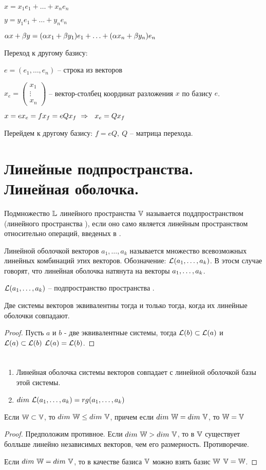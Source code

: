 $x=x_1e_1+\ldots+x_ne_n$

$y=y_1e_1+\ldots+y_ne_n$

$\alpha x+\beta y=(\alpha x_1+\beta y_1)e_1+\ldots+(\alpha x_n+\beta y_n)e_n$

Переход к другому базису:

$e=(e_1,\ldots,e_n)$ -- строка из векторов

$x_e=\left(\begin{matrix} x_1 \\ \vdots \\ x_n \end{matrix}\right)$ -- вектор-столбец координат разложения $x$ по базису $e$.

$x=ex_e=fx_f=eQx_f\ \then\ x_e=Qx_f$

Перейдем к другому базису: $f=eQ,\ Q$ -- матрица перехода.
\section{Линейные подпространства. Линейная оболочка.}
\begin{opred}
Подмножество $\mathbb{L}$ линейного пространства $\mathbb{V}$ называется поддпространством (линейного пространства \V), если оно само является линейным пространством относительно операций, введеных в \V.
\end{opred}
\begin{opred}
Линейной оболочкой векторов $a_1,\ldots,a_k$ называется множество всевозможных линейных комбинаций этих векторов. Обозначение: $\mathcal{L}(a_1,\ldots,a_k)$. В этосм случае говорят, что линейная оболочка натянута на векторы $a_1,\ldots,a_k$.
\end{opred}
\begin{stat}
$\mathcal{L}(a_1,\ldots,a_k)$ -- подпространство пространства \V.
\end{stat}
\begin{theor}
Две системы векторов эквивалентны тогда и только тогда, когда их линейные оболочки совпадают.
\end{theor}
\begin{proof}
Пусть $a$ и $b$  - две эквивалентные системы, тогда $\mathcal{L}(b)\subset\mathcal{L}(a)$ и $\mathcal{L}(a)\subset\mathcal{L}(b)$ \then $\mathcal{L}(a)=\mathcal{L}(b)$.
\end{proof}
\begin{effect}
$\phantom{dick}$
\begin{enumerate}
\item Линейная оболочка системы векторов совпадает с линейной оболочкой базы этой системы.
\item $dim\ \mathcal{L}(a_1,\ldots,a_k)=rg(a_1,\ldots,a_k)$
\end{enumerate}
\end{effect}
\begin{theor}
Если $\mathbb{W}\subset\mathbb{V}$, то $dim\ \mathbb{W}\leq dim\ \mathbb{V}$, причем если $dim\ \mathbb{W}=dim\ \mathbb{V}$, то $\mathbb{W}=\mathbb{V}$
\end{theor}
\begin{proof}
Предположим противное. Если $dim\ \mathbb{W}>dim\ \mathbb{V}$, то в $\mathbb{V}$ существует болльше линейно независимых векторов, чем его размерность. Противоречие.

Если $dim\ \mathbb{W}=dim\ \mathbb{V}$, то в качестве базиса $\mathbb{V}$ можно взять базис $\mathbb{W}$ \then $\mathbb{V}=\mathbb{W}$.
\end{proof}
